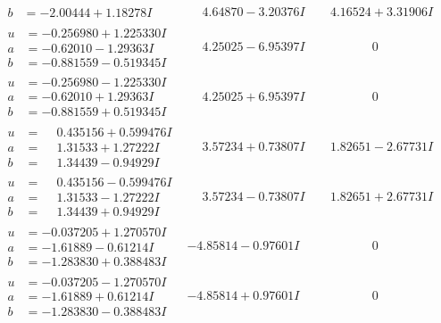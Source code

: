 \documentclass[1p]{elsarticle_modified}
\theoremstyle{definition}
\begin{document}
$$\begin{array}{c|c|c}
\begin{aligned}
b &= -2.00444 + 1.18278 I\end{aligned}
 & \phantom{-}4.64870 - 3.20376 I & \phantom{-}4.16524 + 3.31906 I \\ \hline\begin{aligned}
u &= -0.256980 + 1.225330 I \\
a &= -0.62010 - 1.29363 I \\
b &= -0.881559 - 0.519345 I\end{aligned}
 & \phantom{-}4.25025 - 6.95397 I & \phantom{-0.000000 } 0 \\ \hline\begin{aligned}
u &= -0.256980 - 1.225330 I \\
a &= -0.62010 + 1.29363 I \\
b &= -0.881559 + 0.519345 I\end{aligned}
 & \phantom{-}4.25025 + 6.95397 I & \phantom{-0.000000 } 0 \\ \hline\begin{aligned}
u &= \phantom{-}0.435156 + 0.599476 I \\
a &= \phantom{-}1.31533 + 1.27222 I \\
b &= \phantom{-}1.34439 - 0.94929 I\end{aligned}
 & \phantom{-}3.57234 + 0.73807 I & \phantom{-}1.82651 - 2.67731 I \\ \hline\begin{aligned}
u &= \phantom{-}0.435156 - 0.599476 I \\
a &= \phantom{-}1.31533 - 1.27222 I \\
b &= \phantom{-}1.34439 + 0.94929 I\end{aligned}
 & \phantom{-}3.57234 - 0.73807 I & \phantom{-}1.82651 + 2.67731 I \\ \hline\begin{aligned}
u &= -0.037205 + 1.270570 I \\
a &= -1.61889 - 0.61214 I \\
b &= -1.283830 + 0.388483 I\end{aligned}
 & -4.85814 - 0.97601 I & \phantom{-0.000000 } 0 \\ \hline\begin{aligned}
u &= -0.037205 - 1.270570 I \\
a &= -1.61889 + 0.61214 I \\
b &= -1.283830 - 0.388483 I\end{aligned}
 & -4.85814 + 0.97601 I & \phantom{-0.000000 } 0 \\ \hline\begin{aligned}

\end{aligned}
\end{array}$$
\end{document}
